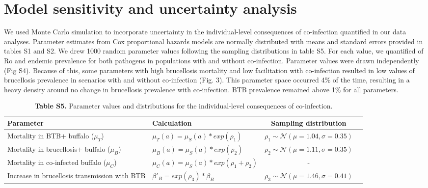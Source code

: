 \documentclass[11pt]{article}
\begin{document}
\section {Model sensitivity and uncertainty analysis }
We used Monte Carlo simulation to incorporate uncertainty in the individual-level consequences of co-infection quantified in our data analyses. %
Parameter estimates from Cox proportional hazards models are normally distributed with means and standard errors provided in tables S1 and S2. We drew 1000 random parameter values following the sampling distributions in table S5.
For each value, we quantified of Ro and endemic prevalence for both pathogens in populations with and without co-infection.  
Parameter values were drawn independently (Fig S4).
Because of this, some parameters with high brucellosis mortality and low facilitation with co-infection resulted in low values of brucellosis prevalence in scenarios with and without co-infection (Fig. 3).
This parameter space occurred 4\% of the time, resulting in a heavy density around no change in brucellosis prevalence with co-infection. 
BTB prevalence remained above 1\% for all parameters.

\begin{table}[H]
\caption*{ \textbf{Table S5.} Parameter values and distributions for the individual-level consequences of co-infection.}
\newcommand{\head}[1]{\textnormal{\textbf{#1}}}
\small
\begin{tabular}{llcc} %
\hline
\head{Parameter} & \head{Calculation} & \head{Sampling distribution} \\*
\hline
Mortality in BTB$+$ buffalo ($\mu_T$) & $\mu_T (a) = \mu_S(a) * exp(\rho_1)$ & $\rho_1 \sim \mathcal{N} (\mu = 1.04, \sigma = 0.35)$  \\*
Mortality in brucellosis$+$ buffalo ($\mu_B$)& $\mu_B (a) = \mu_S(a) * exp(\rho_2)$ & $\rho_2 \sim \mathcal{N} (\mu = 1.11, \sigma = 0.35)$ \\*
Mortality in co-infected buffalo ($\mu_C$) & $\mu_C (a) = \mu_S(a) * exp(\rho_1 + \rho_2)$ & - \\* 
Increase in brucellosis transmission with BTB & $\beta'_B = exp(\rho_3) * \beta_B$ & $\rho_3 \sim  \mathcal{N} (\mu = 1.46, \sigma = 0.41)$\\* 
\hline 
\end{tabular}
\end{table} 
\end{document}
